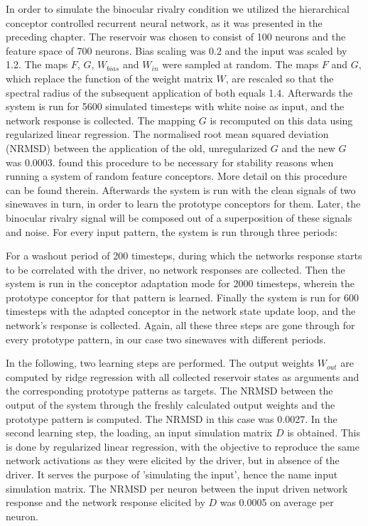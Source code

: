 \documentclass{frontiersSCNS} %
\begin{document}
	In order to simulate the binocular rivalry condition we utilized the hierarchical conceptor controlled recurrent neural network, as it was presented in the preceding chapter. The reservoir was chosen to consist of 100 neurons and the feature space of 700 neurons. Bias scaling was 0.2 and the input was scaled by 1.2. The maps $F$, $G$, $W_{bias}$ and $W_{in}$ were sampled at random.  
	The maps $F$ and $G$, which replace the function of the weight matrix $W$, are rescaled so that the spectral radius of the subsequent application of both equals 1.4. Afterwards the system is run for 5600 simulated timesteps with white noise as input, and the network response is collected. The mapping $G$ is recomputed on this data using regularized linear regression. The normalised root mean squared deviation (NRMSD) between the application of the old, unregularized $G$ and the new $G$ was 0.0003. \cite{Jaeger2014} found this procedure to be necessary for stability reasons when running a system of random feature conceptors. More detail on this procedure can be found therein. 
	Afterwards the system is run with the clean signals of two sinewaves in turn, in order to learn the prototype conceptors for them. Later, the binocular rivalry signal will be composed out of a superposition of these signals and noise. For every input pattern, the system is run through three periods:
	
	For a washout period of 200 timesteps, during which the networks response starts to be correlated with the driver, no network responses are collected. Then the system is run in the conceptor adaptation mode for 2000 timesteps, wherein the prototype conceptor for that pattern is learned. Finally the system is run for 600 timesteps with the adapted conceptor in the network state update loop, and the network's response is collected. Again, all these three steps are gone through for every prototype pattern, in our case two sinewaves with different periods. 
	
	In the following, two learning steps are performed. The output weights $W_{out}$ are computed by ridge regression with all collected reservoir states as arguments and the corresponding prototype patterns as targets. The NRMSD between the output of the system through the freshly calculated output weights and the prototype pattern is computed. The NRMSD in this case was 0.0027.
	In the second learning step, the loading, an input simulation matrix $D$ is obtained. This is done by regularized linear regression, with the objective to reproduce the same network activations as they were elicited by the driver, but in absence of the driver. It serves the purpose of 'simulating the input', hence the name input simulation matrix. The NRMSD per neuron between the input driven network response and the network response elicited by $D$ was 0.0005 on average per neuron.  
	
\end{document}
